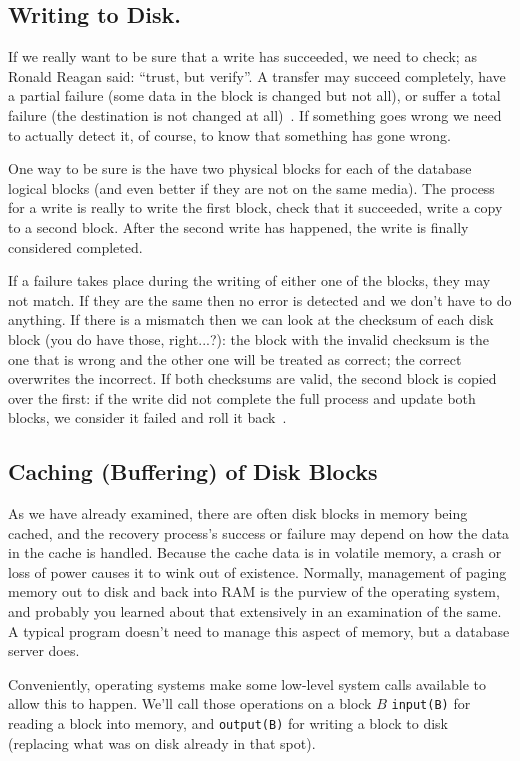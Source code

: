 \subsection*{Writing to Disk.}

If we really want to be sure that a write has succeeded, we need to check; as Ronald Reagan said: ``trust, but verify''. A transfer may succeed completely, have a partial failure (some data in the block is changed but not all), or suffer a total failure (the destination is not changed at all)~\cite{dsc}. If something goes wrong we need to actually detect it, of course, to know that something has gone wrong. 

One way to be sure is the have two physical blocks for each of the database logical blocks (and even better if they are not on the same media). The process for a write is really to write the first block, check that it succeeded, write a copy to a second block. After the second write has happened, the write is finally considered completed. 

If a failure takes place during the writing of either one of the blocks, they may not match. If they are the same then no error is detected and we don't have to do anything. If there is a mismatch then we can look at the checksum of each disk block (you do have those, right...?): the block with the invalid checksum is the one that is wrong and the other one will be treated as correct; the correct overwrites the incorrect. If both checksums are valid, the second block is copied over the first: if the write did not complete the full process and update both blocks, we consider it failed and roll it back~\cite{dsc}.

\subsection*{Caching (Buffering) of Disk Blocks}

As we have already examined, there are often disk blocks in memory being cached, and the recovery process's success or failure may depend on how the data in the cache is handled. Because the cache data is in volatile memory, a crash or loss of power causes it to wink out of existence. Normally, management of paging memory out to disk and back into RAM is the purview of the operating system, and probably you learned about that extensively in an examination of the same. A typical program doesn't need to manage this aspect of memory, but a database server does.

Conveniently, operating systems make some low-level system calls available to allow this to happen. We'll call those operations on a block $B$ \texttt{input(B)} for reading a block into memory, and \texttt{output(B)} for writing a block to disk (replacing what was on disk already in that spot). 

